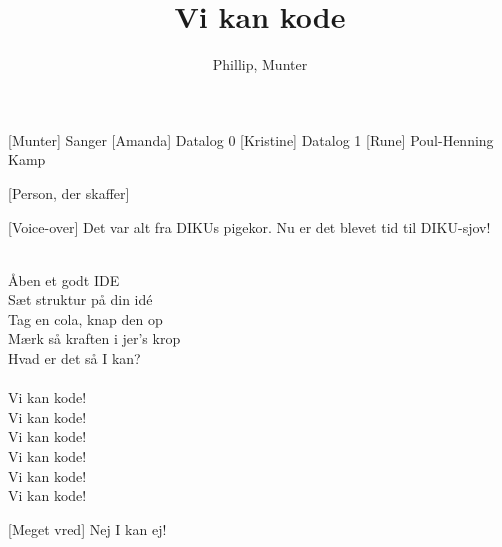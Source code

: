 \documentclass[a4paper,11pt]{article}
\title{Vi kan kode}
\author{Phillip, Munter}
\begin{document}
\maketitle

\begin{roles}
[Munter] Sanger
[Amanda] Datalog 0
[Kristine] Datalog 1
[Rune] Poul-Henning Kamp
\end{roles}

\begin{props}
[Person, der skaffer]
\end{props}

  
\begin{sketch}


[Voice-over] Det var alt fra DIKUs pigekor. Nu er det blevet tid til DIKU-sjov!


 \\
Åben et godt IDE \\
Sæt struktur på din idé \\
Tag en cola, knap den op \\
Mærk så kraften i jer's krop \\
Hvad er det så I kan? \\

 \\
Vi kan kode!\\
Vi kan kode!\\
Vi kan kode!\\
Vi kan kode!\\
Vi kan kode!\\
Vi kan kode!\\


[Meget vred] Nej I kan ej!


\end{sketch}
\end{document}
